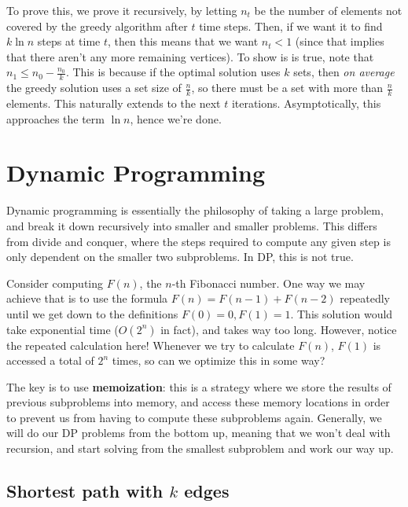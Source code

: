 \documentclass[10pt]{article}
\begin{document}
	To prove this, we prove it recursively, by letting \( n_t \) be the number of elements not covered by the greedy algorithm 
	after \( t \) time steps. Then, if we want it to find \( k \ln n\) steps at time \( t \), then this means that 
	we want \( n_t < 1 \) (since that implies that there aren't any more remaining vertices). To show is is true, note that 
	\( n_1 \le  n_0 - \frac{n_0}{k} \). This is because if the optimal solution uses \( k \) sets, then \textit{on average} 
	the greedy solution uses a set size of \( \frac{n}{k} \), so there must be a set with more than \( \frac{n}{k} \) elements. 
	This naturally extends to the next \( t \) iterations. Asymptotically, this approaches the term \( \ln n \), hence 
	we're done. 


	\section{Dynamic Programming}

	Dynamic programming is essentially the philosophy of taking a large problem, and break it down recursively into smaller 
	and smaller problems. This differs from divide and conquer, where the steps required to compute any given step is only 
	dependent on the smaller two subproblems. In DP, this is not true. 

	Consider computing \( F(n) \), the \( n \)-th Fibonacci number. One way we may achieve that is to use the formula 
	\( F(n) = F(n-1) + F(n - 2) \) repeatedly until we get down to the definitions \( F(0) = 0, F(1) = 1 \). This solution would 
	take exponential time (\( O(2^{n}) \) in fact), and takes way too long. However, notice the repeated calculation here! 
	Whenever we try to calculate \( F(n) \), \( F(1) \) is accessed a total of \( 2^{n}  \) times, so can we optimize this 
	in some way? 

	The key is to use \textbf{memoization}: this is a strategy where we store the results of previous subproblems into memory, and
	access these memory locations in order to prevent us from having to compute these subproblems again. Generally, we will do 
	our DP problems from the bottom up, meaning that we won't deal with recursion, and start solving from the smallest 
	subproblem and work our way up. 

	\subsection{Shortest path with \( k \) edges}
	
\end{document}
